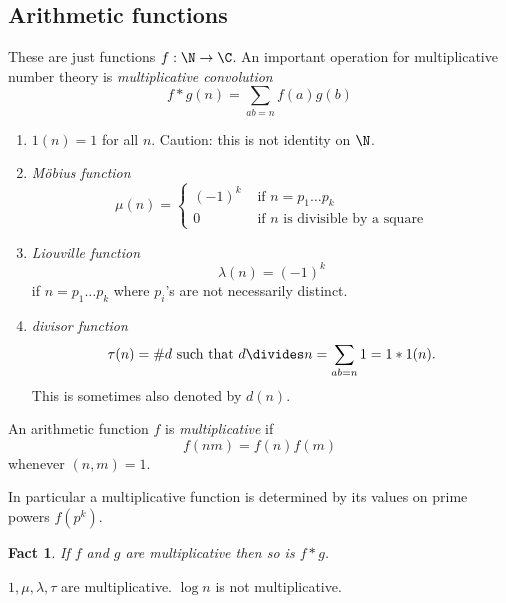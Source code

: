 \documentclass[a4paper]{article}
\newtheorem*{fact}{Fact}
\begin{document}
\subsection{Arithmetic functions}

These are just functions \(f: \N \to \C\). An important operation for multiplicative number theory is \emph{multiplicative convolution}
\[
  f * g(n) = \sum_{ab = n} f(a)g(b)
\]

\begin{eg}\leavevmode
  \begin{enumerate}
  \item \(1(n) = 1\) for all \(n\). Caution: this is not identity on \(\N\).
  \item \emph{Möbius function}
    \[
      \mu(n) =
      \begin{cases}
        (-1)^k & \text{ if } n = p_1 \dots p_k \\
        0 & \text{ if \(n\) is divisible by a square}
      \end{cases}
    \]
  \item \emph{Liouville function}
    \[
      \lambda(n) = (-1)^k
    \]
    if \(n = p_1 \dots p_k\) where \(p_i\)'s are not necessarily distinct.
  \item \emph{divisor function}
    \[
      \tau(n) = \#d \text{ such that } d \divides n = \sum_{ab = n} 1 = 1 * 1(n).
    \]
    This is sometimes also denoted by \(d(n)\).
  \end{enumerate}
\end{eg}

\begin{definition}
  An arithmetic function \(f\) is \emph{multiplicative} if
  \[
    f(nm) = f(n)f(m)
  \]
  whenever \((n, m) = 1\).
\end{definition}

In particular a multiplicative function is determined by its values on prime powers \(f(p^k)\).

\begin{fact}
  If \(f\) and \(g\) are multiplicative then so is \(f * g\).
\end{fact}

\begin{eg}
  \(1, \mu, \lambda, \tau\) are multiplicative. \(\log n\) is not multiplicative.
\end{eg}
\end{document}
